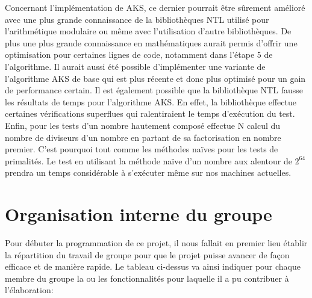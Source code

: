 		Concernant l'implémentation de AKS, ce dernier pourrait être sûrement amélioré avec une plus grande connaissance de la bibliothèques NTL utilisé pour l'arithmétique modulaire ou même avec l'utilisation d'autre bibliothèques. De plus une plus grande connaissance en mathématiques aurait permis d'offrir une optimisation pour certaines lignes de code, notamment dans l'étape 5 de l’algorithme. Il aurait aussi été possible d'implémenter une variante de l’algorithme AKS de base qui est plus récente et donc plus optimisé pour un gain de performance certain.
Il est également possible que la bibliothèque NTL fausse les résultats de temps pour l'algorithme AKS. En effet, la bibliothèque effectue certaines vérifications superflues qui ralentiraient le temps d’exécution du test.\\
		
		Enfin, pour les tests d'un nombre hautement composé effectue N calcul du nombre de diviseurs d'un nombre en partant de sa factorisation en nombre premier. C'est pourquoi tout comme les méthodes naïves pour les tests de primalités. Le test en utilisant la méthode naïve d'un nombre aux alentour de $2^{64}$ prendra un temps considérable à s’exécuter même sur nos machines actuelles.
					
	\section{Organisation interne du groupe}
	Pour débuter la programmation de ce projet, il nous fallait en premier lieu établir la répartition du travail de groupe pour que le projet puisse avancer de façon efficace et de manière rapide. Le tableau ci-dessus va ainsi indiquer pour chaque membre du groupe la ou les fonctionnalités pour laquelle il a pu contribuer à l'élaboration: \\
	
